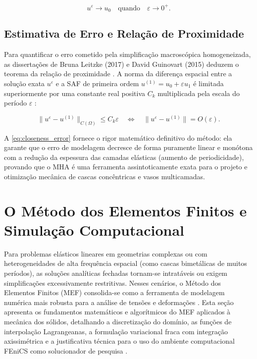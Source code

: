 \begin{equation}
     u^\varepsilon \to u_0 \quad \text{quando} \quad \varepsilon \to 0^+. 
\end{equation} \label{eq:weak_conv}

\subsection{Estimativa de Erro e Relação de Proximidade}
Para quantificar o erro cometido pela simplificação macroscópica homogeneizada, as dissertações de Bruna Leitzke (2017) e David Guinovart (2015) deduzem o teorema da relação de proximidade \cite{leitzke2017}. A norma da diferença espacial entre a solução exata $u^\varepsilon$ e a SAF de primeira ordem $u^{(1)} = u_0 + \varepsilon u_1$ é limitada superiormente por uma constante real positiva $C_k$ multiplicada pela escala do período $\varepsilon$ \cite{Guinovart2024}:

\begin{equation}
  \|u^\varepsilon - u^{(1)}\|_{C(\Omega)} \le C_k \varepsilon \quad \Leftrightarrow \quad \|u^\varepsilon - u^{(1)}\| = O(\varepsilon).
  \label{eq:closeness_error}
\end{equation}

A \eqref{eq:closeness_error} fornece o rigor matemático definitivo do método: ela garante que o erro de modelagem decresce de forma puramente linear e monótona com a redução da espessura das camadas elásticas (aumento de periodicidade), provando que o MHA é uma ferramenta assintoticamente exata para o projeto e otimização mecânica de cascas concêntricas e vasos multicamadas.

\section{O Método dos Elementos Finitos e Simulação Computacional}

Para problemas elásticos lineares em geometrias complexas ou com heterogeneidades de alta frequência espacial (como cascas bimetálicas de muitos períodos), as soluções analíticas fechadas tornam-se intratáveis ou exigem simplificações excessivamente restritivas. Nesses cenários, o Método dos Elementos Finitos (MEF) consolida-se como a ferramenta de modelagem numérica mais robusta para a análise de tensões e deformações \cite{Sadd2009}. Esta seção apresenta os fundamentos matemáticos e algorítmicos do MEF aplicados à mecânica dos sólidos, detalhando a discretização do domínio, as funções de interpolação Lagrangeanas, a formulação variacional fraca com integração axissimétrica e a justificativa técnica para o uso do ambiente computacional FEniCS como solucionador de pesquisa \cite{logg2012automated}.

